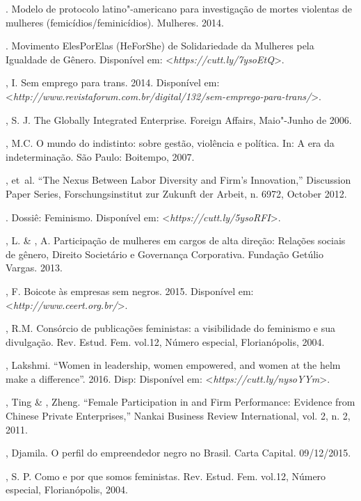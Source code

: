 \begin{Parskip}
. Modelo de protocolo latino"-americano para investigação de
mortes violentas de mulheres (femicídios/feminicídios).  Mulheres.
2014.

. Movimento ElesPorElas (HeForShe) de Solidariedade da 
Mulheres pela Igualdade de Gênero.
Disponível em: \textless{}\emph{https://cutt.ly/7ysoEtQ}\textgreater{}.

, I. Sem emprego para trans. 2014.
Disponível em: \textless{}\emph{http://www.revistaforum.com.br/digital/132/sem-emprego-para-trans/}\textgreater{}.

, S. J. The Globally Integrated Enterprise. Foreign Affairs,
Maio"-Junho de 2006.

, M.C. O mundo do indistinto: sobre gestão, violência e política.
In: A era da indeterminação. São Paulo: Boitempo, 2007.

, et~al. ``The Nexus Between Labor Diversity and Firm's
Innovation,'' Discussion Paper Series, Forschungsinstitut zur Zukunft
der Arbeit, n. 6972, October 2012.

. Dossiê: Feminismo.
Disponível em: \textless{}\emph{https://cutt.ly/5ysoRFI}\textgreater{}.

, L. \& , A. Participação de mulheres em cargos de alta
direção: Relações sociais de gênero, Direito Societário e Governança
Corporativa. Fundação Getúlio Vargas. 2013.

, F. Boicote às empresas sem negros. 2015.
Disponível em: \textless{}\emph{http://www.ceert.org.br/}\textgreater{}.

, R.M. Consórcio de publicações feministas: a visibilidade do
feminismo e sua divulgação. Rev. Estud. Fem. vol.12, Número especial,
Florianópolis, 2004.

, Lakshmi. ``Women in leadership, women empowered, and women at the
helm make a difference''. 2016. Disp:
Disponível em: \textless{}\emph{https://cutt.ly/nysoYYm}\textgreater{}.

, Ting \& , Zheng. ``Female Participation in  and Firm
Performance: Evidence from Chinese Private Enterprises,'' Nankai
Business Review International, vol. 2, n. 2, 2011.

, Djamila. O perfil do empreendedor negro no Brasil. Carta
Capital. 09/12/2015.

, S. P. Como e por que somos feministas. Rev. Estud. Fem. vol.12,
Número especial, Florianópolis, 2004.


\end{Parskip}
